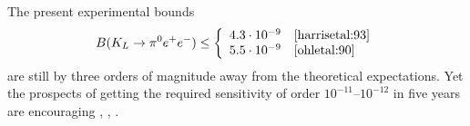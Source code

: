 The present experimental bounds
\begin{equation}
B(K_L \to \pi^0 e^+ e^-) \leq
\left\{ \begin{array}{ll}
4.3 \cdot 10^{-9} & \hbox{\cite{harrisetal:93}} \\
5.5 \cdot 10^{-9} & \hbox{\cite{ohletal:90}}
\end{array} \right.
\label{eq:BKLbounds}
\end{equation}
are still by three orders of magnitude away from the theoretical
expectations. Yet the prospects of getting the required sensitivity of
order $10^{-11}$--$10^{-12}$ in five years are encouraging
\cite{littenbergvalencia:93}, \cite{winsteinwolfenstein:93},
\cite{ritchiewojcicki:93}.
